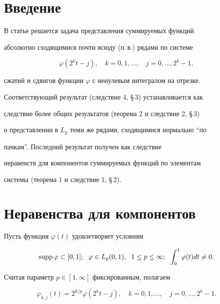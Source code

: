 \label{begin} 


 


\section{Введение} 


 


В статье решается задача представления суммируемых функций 


абсолютно сходящимися почти всюду (п.\,в.) рядами по системе 


$$ 


\varphi(2^k t-j),\quad k=0,1,\dotsc,\quad j=0,\dotsc,2^k-1, 


$$ 


сжатий и сдвигов функции $\varphi$ с ненулевым интегралом на отрезке.  


Соответствующий результат (следствие 4, \S\,3) устанавливается как  


следствие более общих результатов (теорема 2 и следствие 2, \S\,3)  


о представлении в $L_p$ теми же рядами, сходящимися нормально ``по 


пачкам''. Последний результат получен как следствие 


неравенств для компонентов суммируемых функций по элементам 


системы (теорема 1 и следствие 1, \S\,2). 


 


\section{Неравенства для компонентов} 


 


Пусть функция $\varphi(t)$ удовлетворяет условиям 


$$ 


\supp\varphi\subset[0,1];\ \; \varphi\in L_p(0,1), 


\ \; 1\le p\le\infty;\ \;\int^1_0\varphi(t)dt\ne 0. 


$$ 


Считая параметр $p\in[1,\infty]$ фиксированным, полагаем 


\begin{equation} 


\varphi_{k,j}(t)=2^{k/p}\varphi(2^k t-j),\quad 


k=0,1,\dotsc,\quad j=0,\dotsc,2^k-1. 


\end{equation} 


